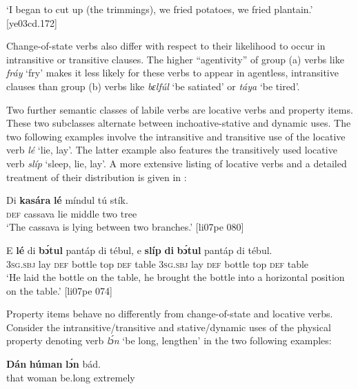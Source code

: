 \glt ‘I began to cut up (the trimmings), we fried potatoes, we fried plantain.’ [ye03cd.172]
\z

Change-of-state verbs also differ with respect to their likelihood to occur in intransitive or transitive clauses. The higher “agentivity” of group (a) verbs like \textit{fráy} ‘fry’ makes it less likely for these verbs to appear in agentless, intransitive clauses than group (b) verbs like \textit{bɛlfúl} ‘be satiated’ or \textit{táya} ‘be tired’.


Two further semantic classes of labile verbs are locative verbs and property items. These two subclasses alternate between inchoative-stative and dynamic uses. The two following examples involve the intransitive  and transitive  use of the locative verb \textit{lé} ‘lie, lay’. The latter example also features the transitively used locative verb \textit{slíp} ‘sleep, lie, lay’. A more extensive listing of locative verbs and a detailed treatment of their distribution is given in :



\ea%
    \label{ex:key:1114}
    \gll Di  \textbf{kasára}  \textbf{lé}  míndul  tú  stík.\\
\textsc{def}  cassava  lie  middle  two  tree\\

\glt ‘The cassava is lying between two branches.’ [li07pe 080]
\z


\ea%
    \label{ex:key:1115}
    \gll E    \textbf{lé}  di  \textbf{bɔ́tul}  pantáp  di  tébul,  e    \textbf{slíp}  
\textbf{di}  \textbf{bɔ́tul}  pantáp  di  tébul.\\
\textsc{3sg.sbj}  lay  \textsc{def}  bottle  top    \textsc{def}  table  \textsc{3sg.sbj}  lay
\textsc{def}  bottle  top    \textsc{def}  table\\

\glt ‘He laid the bottle on the table, he brought the bottle into a 
horizontal position on the table.’ [li07pe 074]
\z

Property items behave no differently from change-of-state and locative verbs. Consider the intransitive/transitive and stative/dynamic uses of the physical property denoting verb \textit{lɔ́n} ‘be long, lengthen’ in the two following examples: 


\ea%
    \label{ex:key:1116}
    \gll \textbf{Dán}    \textbf{húman}  \textbf{lɔ́n}    bád.\\
that    woman  be.long  extremely\\

